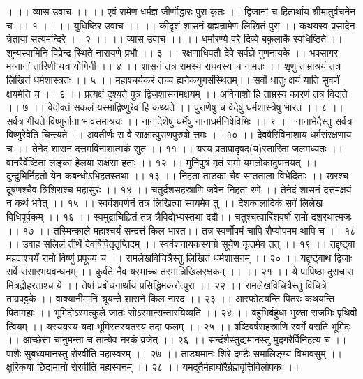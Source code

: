 । ।। व्यास उवाच ।। ।।
एवं रामेण धर्मज्ञ जीर्णोद्धारः पुरा कृतः ।।
द्विजानां च हितार्थाय श्रीमातुर्वचनेन च ।। १ ।।
।। युधिष्ठिर उवाच ।। ।।
कीदृशं शासनं ब्रह्मन्रामेण लिखितं पुरा ।।
कथयस्व प्रसादेन त्रेतायां सत्यमन्दिरे ।। २ ।।
।। व्यास उवाच ।। ।।
धर्मारण्ये वरे दिव्ये बकुलार्के स्वधिष्ठिते ।।
शून्यस्वामिनि विप्रेन्द्र स्थिते नारायणे प्रभौ ।। ३ ।।
रक्षणाधिपतौ देवे सर्वज्ञे गुणनायके ।।
भवसागर मग्नानां तारिणी यत्र योगिनी ।। ४ ।।
शासनं तत्र रामस्य राघवस्य च नामतः ।।
शृणु ताम्राश्रयं तत्र लिखितं धर्मशास्त्रतः ।। ५ ।।
महाश्चर्यकरं तच्च ह्यनेकयुगसंस्थितम्।।
सर्वो धातुः क्षयं याति सुवर्णं क्षयमेति च ।। ६ ।।
प्रत्यक्षं दृश्यते पुत्र द्विजशासनमक्षयम् ।।
अविनाशो हि ताम्रस्य कारणं तत्र विद्यते ।। ७ ।।
वेदोक्तं सकलं यस्माद्विष्णुरेव हि कथ्यते ।।
पुराणेषु च वेदेषु धर्मशास्त्रेषु भारत ।। ८ ।।
सर्वत्र गीयते विष्णुर्नाना भावसमाश्रयः ।।
नानादेशेषु धर्मेषु नानाधर्मनिषेविभिः ।। ९ ।।
नानाभेदैस्तु सर्वत्र विष्णुरेवेति चिन्त्यते ।।
अवतीर्णः स वै साक्षात्पुराणपुरुषो त्तमः ।। १० ।।
देववैरिविनाशाय धर्मसंरक्षणाय च ।।
तेनेदं शासनं दत्तमविनाशात्मकं सुत ।। ११ ।।
यस्य प्रतापादृषद(य)स्तारिता जलमध्यतः ।।
वानरैर्वेष्टिता लङ्का हेलया राक्षसा हताः ।। १२ ।।
मुनिपुत्रं मृतं रामो यमलोकादुपानयत् ।।
दुन्दुभिर्निहतो येन कबन्धोऽभिहतस्तथा ।। १३ ।।
निहता ताडका चैव सप्तताला विभेदिताः ।।
खरश्च दूषणश्चैव त्रिशिराश्च महासुरः ।। १४ ।।
चतुर्दशसहस्राणि जवेन निहता रणे ।।
तेनेदं शासनं दत्तमक्षयं न कथं भवेत् ।। १५ ।।
स्ववंशवर्णनं तत्र लिखित्वा स्वयमेव तु ।।
देशकालादिकं सर्वं लिलेख विधिपूर्वकम् ।। १६ ।।
स्वमुद्राचिह्नितं तत्र त्रैविद्येभ्यस्तथा ददौ।।
चतुश्चत्वारिंशवर्षो रामो दशरथात्मजः ।। १७ ।।
तस्मिन्काले महाश्चर्यं सन्दत्तं किल भारत।।
तत्र स्वर्णोपमं चापि रौप्योपमम थापि च ।। १८ ।।
उवाह सलिलं तीर्थे देवर्षिपितृतृप्तिदम् ।।
स्ववंशनायकस्याग्रे सूर्येण कृतमेव तत् ।। १९ ।।
तद्दृष्ट्वा महदाश्चर्यं रामो विष्णुं प्रपूज्य च ।।
रामलेखविचित्रैस्तु लिखितं धर्मशासनम् ।। २० ।।
यद्दृष्ट्वाथ द्विजाः सर्वे संसारभयबन्धनम् ।।
कुर्वते नैव यस्माच्च तस्मान्निखिलरक्षकम् ।। ।। २१ ।।
ये पापिष्ठा दुराचारा मित्रद्रोहरताश्च ये ।।
तेषां प्रबोधनार्थाय प्रसिद्धिमकरोत्पुरा ।। २२ ।।
रामलेखविचित्रैस्तु विचित्रे ताम्रपट्टके ।।
वाक्यानीमानि श्रूयन्ते शासने किल नारद ।। २३ ।।
आस्फोटयन्ति पितरः कथयन्ति पितामहाः ।।
भूमिदोऽस्मत्कुले जातः सोऽस्मान्सन्तारयिष्यति ।। २४ ।।
बहुभिर्बहुधा भुक्ता राजभिः पृथिवी त्वियम् ।।
यस्ययस्य यदा भूमिस्तस्यतस्य तदा फलम् ।। २५ ।।
षष्टिवर्षसहस्राणि स्वर्गे वसति भूमिदः ।।
आच्छेत्ता चानुमन्ता च तान्येव नरकं व्रजेत् ।। २६ ।।
सन्दंशैस्तुद्यमानस्तु मुद्गरैर्विनिहत्य च ।।
पाशैः सुबध्यमानस्तु रोरवीति महास्वरम् ।। २७ ।।
ताड्यमानः शिरे दण्डैः समालिङ्ग्य विभावसुम् ।।
क्षुरिकया छिद्यमानो रोरवीति महास्वनम् ।। २८ ।।
यमदूतैर्महाघोरैर्ब्रह्मवृत्तिविलोपकः ।।
